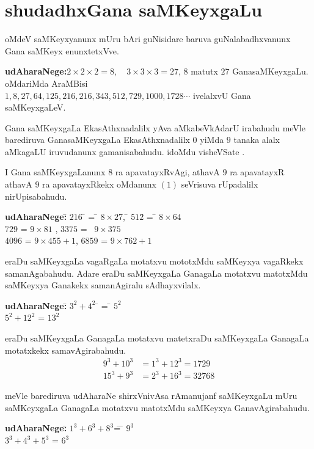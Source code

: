 \chapter{shudadhxGana saMKeyxgaLu}

oMdeV saMKeyxyanunx mUru bAri guNisidare baruva guNalabadhxvanunx Gana saMKeyx enunxtetxVve.

\textbf{udAharaNege:}\quad $2\times 2\times 2 =8, \quad 3\times 3 \times 3 =27$, $8$ matutx $27$ GanasaMKeyxgaLu. oMdariMda AraMBisi\\
 $1,8,27,64,125,216,216,343,512,729,1000,1728\cdots$ ivelalxvU Gana saMKeyxgaLeV.
 
Gana saMKeyxgaLa EkasAthxnadalilx yAva aMkabeVkAdarU irabahudu meVle barediruva GanasaMKeyxgaLa EkasAthxnadalilx $0$ yiMda $9$ tanaka alalx aMkagaLU iruvudanunx \-gamanisabahudu. idoMdu visheVSate . 

I Gana saMKeyxgaLanunx $8$ ra apavatayxRvAgi, athavA $9$ ra apavatayxR athavA $9$ ra apavatayxRkekx oMdanunx $(1)$ seVrisuva rUpadalilx nirUpisabahudu.
\begin{tabbing}
\textbf{udAharaNege:}\qquad\;\;\=\;\; $216$ \=\; = \= $8\times 27$, \qquad\;\;\=\;\; $512$\=\; = \= $8\times 64$\\
\> \;\; $729$ \>\; = \> $9\times 81$ , \> \;\; $3375$\>\; = \>\ $9\times 375$\\
\> \;\; $4096$ \>\; = \> $9\times 455+1$,\quad\> \;\;$6859$\>\; = \> $9\times 762+1$\\
\end{tabbing}

eraDu saMKeyxgaLa vagaRgaLa motatxvu mototxMdu saMKeyxya vagaRkekx samanAgabahudu. Adare eraDu saMKeyxgaLa GanagaLa motatxvu matotxMdu saMKeyxya Ganakekx samanAgiralu sAdhayxvilalx.
\begin{tabbing}
\textbf{udAharaNege:}\qquad\;\;\=\;\; $3^{2}+4^{2}$ \=\; = \= $5^{2}$\\
\> \;\;$5^{2}+12^{2}$\>\; = \> $13^{2}$ \qquad{}
\end{tabbing}

eraDu saMKeyxgaLa GanagaLa motatxvu matetxraDu saMKeyxgaLa GanagaLa motatxkekx samavAgirabahudu.
\begin{align*}
9^{3}+10^{3} &=1^{3}+12^{3}=1729\\
15^{3}+9^{3} &=2^{3}+16^{3}=32768
\end{align*}

meVle barediruva udAharaNe shirxVnivAsa rAmanujanf saMKeyxgaLu mUru saMKeyxgaLa GanagaLa motatxvu matotxMdu saMKeyxya GanavAgirabahudu.
\begin{tabbing}
\textbf{udAharaNege:}\qquad\= $1^{3}+6^{3}+8^{3}$\= = \= $9^{3}$\\
\> $3^{3}+4^{3}+5^{3}$ \> = \> $6^{3}$
\end{tabbing}

